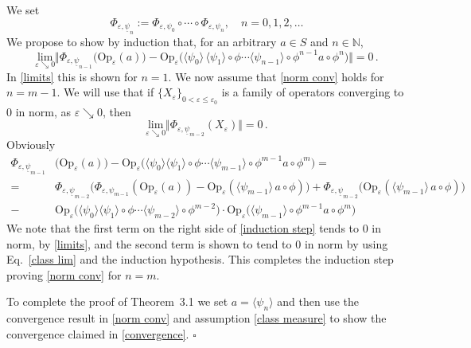 \documentclass[12pt]{article}
\begin{document}
We set
$$\Phi_{\varepsilon, \underline{\psi}_n} := \Phi_{\varepsilon, \psi_0}\circ \cdots \circ \Phi_{\varepsilon, \psi_n}, \quad n=0,1,2, \dots$$
We propose to show by induction that, for an arbitrary $a\in S$ and $n\in \mathbb{N}$,
\begin{equation}\label{norm conv}
\underset{\varepsilon\searrow 0}{\text{lim}}\Vert \Phi_{\varepsilon, \underline{\psi}_{n-1}}(\text{Op}_{\varepsilon}(a)\big)
- \text{Op}_{\varepsilon}\big(\langle \psi_0 \rangle\,\langle \psi_1 \rangle \circ \phi \cdots \langle \psi_{n-1}\rangle \circ
\phi^{n-1} a\circ \phi^{n}\big)\Vert = 0\,.
\end{equation}
In \eqref{limits} this is shown for $n=1$. We now assume that \eqref{norm conv} holds for $n=m-1$. We will use that if 
$\{X_{\varepsilon}\}_{0<\varepsilon \leq \varepsilon_0}$ is a family of operators converging to 0 in norm, as 
$\varepsilon \searrow 0$, then 
\begin{equation}\label{zero}
\underset{\varepsilon\searrow 0}{\text{lim}}\Vert\Phi_{\varepsilon, \underline{\psi}_{m-2}}(X_{\varepsilon})\Vert =0\,.
\end{equation}
Obviously
\begin{align}
\Phi_{\varepsilon, \underline{\psi}_{m-1}}& \big(\text{Op}_{\varepsilon}(a) \big)-
\text{Op}_{\varepsilon}\big(\langle \psi_0\rangle \langle \psi_1\rangle \circ \phi \cdots \langle \psi_{m-1}\rangle \circ \phi^{m-1} a\circ \phi^{m}\big) = \qquad\quad \nonumber \\
= & \Phi_{\varepsilon,\underline{\psi}_{m-2}} \big(\Phi_{\varepsilon, \psi_{m-1}}(\text{Op}_{\varepsilon} (a))- 
\text{Op}_{\varepsilon}(\langle \psi_{m-1}\rangle\, a \circ \phi)\big) + \Phi_{\varepsilon, \underline{\psi}_{m-2}} 
\big(\text{Op}_{\varepsilon}(\langle \psi_{m-1} \rangle\, a \circ \phi)\big) \nonumber \\
- &\text{Op}_{\varepsilon}\big(\langle \psi_0 \rangle \langle \psi_1 \rangle \circ \phi \cdots \langle \psi_{m-2} \rangle 
\circ \phi^{m-2}\big)\cdot \text{Op}_{\varepsilon}\big( \langle \psi_{m-1} \rangle \circ \phi^{m-1} a \circ \phi^{m}\big)
\label{induction step}
\end{align}
We note that the first term on the right side of \eqref{induction step} tends to 0 in norm, by \eqref{limits}, 
and the second term is shown to tend to 0 in norm by using Eq.~\eqref{class lim} and the induction hypothesis. This completes
the induction step proving \eqref{norm conv} for $n=m$.

To complete the proof of Theorem~3.1 we set $a=\langle \psi_n \rangle$ and then use the convergence result 
in \eqref{norm conv} and assumption \eqref{class measure} to show the convergence claimed in \eqref{convergence}.
\hfill$\square$
\end{document}
